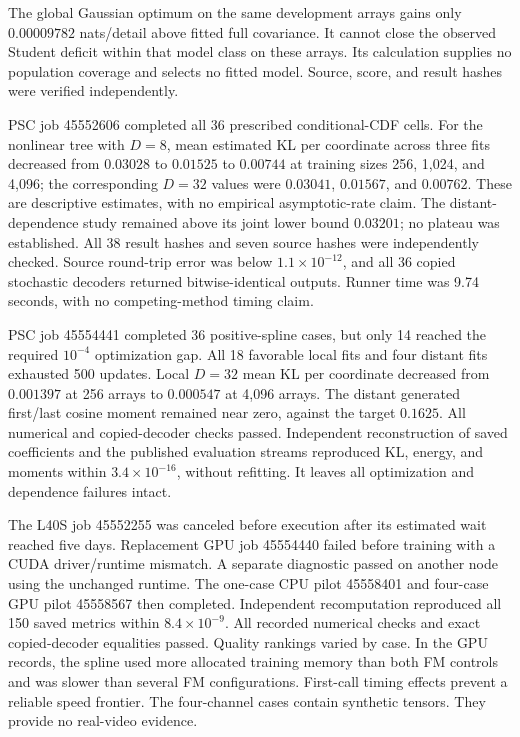 \documentclass[11pt]{article}
\begin{document}
The global Gaussian optimum on the same development arrays gains only $0.00009782$ nats/detail above fitted full covariance. It cannot close the observed Student deficit within that model class on these arrays. Its calculation supplies no population coverage and selects no fitted model. Source, score, and result hashes were verified independently.

PSC job 45552606 completed all 36 prescribed conditional-CDF cells. For the nonlinear tree with $D=8$, mean estimated KL per coordinate across three fits decreased from $0.03028$ to $0.01525$ to $0.00744$ at training sizes 256, 1,024, and 4,096; the corresponding $D=32$ values were $0.03041$, $0.01567$, and $0.00762$. These are descriptive estimates, with no empirical asymptotic-rate claim. The distant-dependence study remained above its joint lower bound $0.03201$; no plateau was established. All 38 result hashes and seven source hashes were independently checked. Source round-trip error was below $1.1\times10^{-12}$, and all 36 copied stochastic decoders returned bitwise-identical outputs. Runner time was 9.74 seconds, with no competing-method timing claim.

PSC job 45554441 completed 36 positive-spline cases, but only 14 reached the required $10^{-4}$ optimization gap. All 18 favorable local fits and four distant fits exhausted 500 updates. Local $D=32$ mean KL per coordinate decreased from $0.001397$ at 256 arrays to $0.000547$ at 4,096 arrays. The distant generated first/last cosine moment remained near zero, against the target $0.1625$. All numerical and copied-decoder checks passed. Independent reconstruction of saved coefficients and the published evaluation streams reproduced KL, energy, and moments within $3.4\times10^{-16}$, without refitting. It leaves all optimization and dependence failures intact.

The L40S job 45552255 was canceled before execution after its estimated wait reached five days. Replacement GPU job 45554440 failed before training with a CUDA driver/runtime mismatch. A separate diagnostic passed on another node using the unchanged runtime. The one-case CPU pilot 45558401 and four-case GPU pilot 45558567 then completed. Independent recomputation reproduced all 150 saved metrics within $8.4\times10^{-9}$. All recorded numerical checks and exact copied-decoder equalities passed. Quality rankings varied by case. In the GPU records, the spline used more allocated training memory than both FM controls and was slower than several FM configurations. First-call timing effects prevent a reliable speed frontier. The four-channel cases contain synthetic tensors. They provide no real-video evidence.
\end{document}
